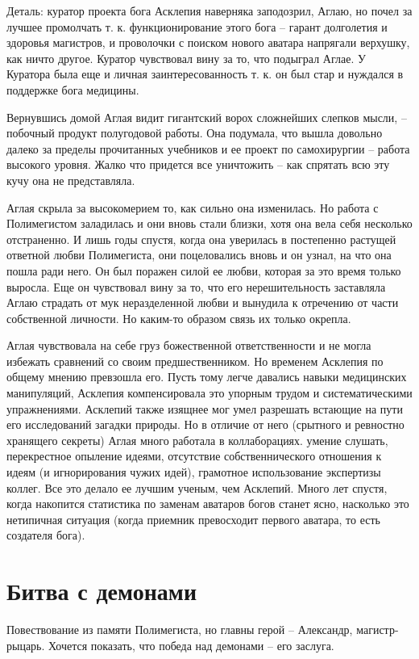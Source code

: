 \documentclass[12pt,a4paper]{article}
\begin{document}
Деталь: куратор проекта бога Асклепия наверняка заподозрил, Аглаю, но почел за лучшее промолчать т. к. функционирование этого бога -- гарант долголетия и здоровья магистров, и проволочки с поиском нового аватара напрягали верхушку, как ничто другое. Куратор чувствовал вину за то, что подыграл Аглае. У Куратора была еще и личная заинтересованность т. к. он был стар и нуждался в поддержке бога медицины.

Вернувшись домой Аглая видит гигантский ворох сложнейших слепков мысли, -- побочный продукт полугодовой работы. Она подумала, что вышла довольно далеко за пределы прочитанных учебников и ее проект по самохирургии -- работа высокого уровня. Жалко что придется все уничтожить -- как спрятать всю эту кучу она не представляла. 

Аглая скрыла за высокомерием то, как сильно она изменилась. Но работа с Полимегистом заладилась и они вновь стали близки, хотя она вела себя несколько отстраненно. И лишь годы спустя, когда она уверилась в постепенно растущей ответной любви Полимегиста, они поцеловались вновь и он узнал, на что она пошла ради него. Он был поражен силой ее любви, которая за это время только выросла. Еще он чувствовал вину за то, что его нерешительность заставляла Аглаю страдать от мук неразделенной любви и вынудила к отречению от части собственной личности. Но каким-то образом связь их только окрепла.

Аглая чувствовала на себе груз божественной ответственности и не могла избежать сравнений со своим предшественником. Но временем Асклепия по общему мнению превзошла его. Пусть тому легче давались навыки медицинских манипуляций, Асклепия компенсировала это упорным трудом и систематическими упражнениями. Асклепий также изящнее мог умел разрешать встающие на пути его исследований загадки природы. Но в отличие от него (срытного и ревностно хранящего секреты) Аглая много работала в коллаборациях. умение слушать, перекрестное опыление идеями, отсутствие собственнического отношения к идеям (и игнорирования чужих идей), грамотное использование экспертизы коллег. Все это делало ее лучшим ученым, чем Асклепий. Много лет спустя, когда накопится статистика по заменам аватаров богов станет ясно, насколько это нетипичная ситуация (когда приемник превосходит первого аватара, то есть создателя бога).

\section*{Битва с демонами}
Повествование из памяти Полимегиста, но главны герой -- Александр, магистр-рыцарь. Хочется показать, что победа над демонами -- его заслуга.
\end{document}
